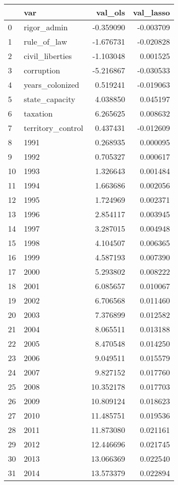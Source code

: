 \begin{tabular}{llrr}
\toprule
 & var & val_ols & val_lasso \\
\midrule
0 & rigor_admin & -0.359090 & -0.003709 \\
1 & rule_of_law & -1.676731 & -0.020828 \\
2 & civil_liberties & -1.103048 & 0.001525 \\
3 & corruption & -5.216867 & -0.030533 \\
4 & years_colonized & 0.519241 & -0.019063 \\
5 & state_capacity & 4.038850 & 0.045197 \\
6 & taxation & 6.265625 & 0.008632 \\
7 & territory_control & 0.437431 & -0.012609 \\
8 & 1991 & 0.268935 & 0.000095 \\
9 & 1992 & 0.705327 & 0.000617 \\
10 & 1993 & 1.326643 & 0.001484 \\
11 & 1994 & 1.663686 & 0.002056 \\
12 & 1995 & 1.724969 & 0.002371 \\
13 & 1996 & 2.854117 & 0.003945 \\
14 & 1997 & 3.287015 & 0.004948 \\
15 & 1998 & 4.104507 & 0.006365 \\
16 & 1999 & 4.587193 & 0.007390 \\
17 & 2000 & 5.293802 & 0.008222 \\
18 & 2001 & 6.085657 & 0.010067 \\
19 & 2002 & 6.706568 & 0.011460 \\
20 & 2003 & 7.376899 & 0.012582 \\
21 & 2004 & 8.065511 & 0.013188 \\
22 & 2005 & 8.470548 & 0.014250 \\
23 & 2006 & 9.049511 & 0.015579 \\
24 & 2007 & 9.827152 & 0.017760 \\
25 & 2008 & 10.352178 & 0.017703 \\
26 & 2009 & 10.809124 & 0.018623 \\
27 & 2010 & 11.485751 & 0.019536 \\
28 & 2011 & 11.873080 & 0.021161 \\
29 & 2012 & 12.446696 & 0.021745 \\
30 & 2013 & 13.066369 & 0.022540 \\
31 & 2014 & 13.573379 & 0.022894 \\

\end{tabular}
